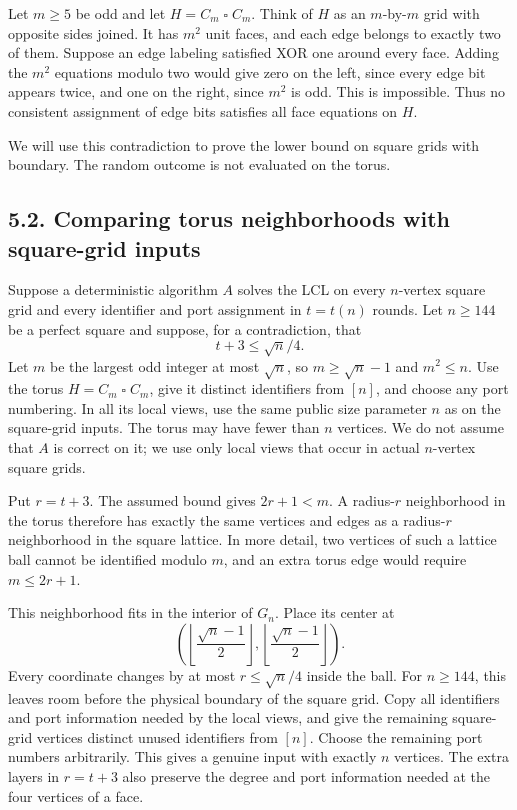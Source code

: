 \documentclass[11pt,a4paper]{article}
\begin{document}
Let \(m\ge5\) be odd and let \(H=C_m\mathbin{\square}C_m\).
Think of \(H\) as an \(m\)-by-\(m\) grid with opposite sides joined.
It has \(m^2\) unit faces, and each edge belongs to exactly two of them.
Suppose an edge labeling satisfied XOR one around every face.
Adding the \(m^2\) equations modulo two would give zero on the left, since every edge bit appears twice, and one on the right, since \(m^2\) is odd.
This is impossible.
Thus no consistent assignment of edge bits satisfies all face equations on \(H\).

We will use this contradiction to prove the lower bound on square grids with boundary.
The random outcome is not evaluated on the torus.

\subsection{5.2. Comparing torus neighborhoods with square-grid inputs}

Suppose a deterministic algorithm \(A\) solves the LCL on every \(n\)-vertex square grid and every identifier and port assignment in \(t=t(n)\) rounds.
Let \(n\ge144\) be a perfect square and suppose, for a contradiction, that
\begin{equation} t+3\le\sqrt n/4. \label{eq:grid-fast-algorithm} \end{equation}
Let \(m\) be the largest odd integer at most \(\sqrt n\), so \(m\ge\sqrt n-1\) and \(m^2\le n\).
Use the torus \(H=C_m\mathbin{\square}C_m\), give it distinct identifiers from \([n]\), and choose any port numbering.
In all its local views, use the same public size parameter \(n\) as on the square-grid inputs.
The torus may have fewer than \(n\) vertices.
We do not assume that \(A\) is correct on it; we use only local views that occur in actual \(n\)-vertex square grids.

Put \(r=t+3\).
The assumed bound gives \(2r+1<m\).
A radius-\(r\) neighborhood in the torus therefore has exactly the same vertices and edges as a radius-\(r\) neighborhood in the square lattice.
In more detail, two vertices of such a lattice ball cannot be identified modulo \(m\), and an extra torus edge would require \(m\le2r+1\).

This neighborhood fits in the interior of \(G_n\).
Place its center at
\[ \left(\left\lfloor\frac{\sqrt n-1}{2}\right\rfloor,\left\lfloor\frac{\sqrt n-1}{2}\right\rfloor\right). \]
Every coordinate changes by at most \(r\le\sqrt n/4\) inside the ball.
For \(n\ge144\), this leaves room before the physical boundary of the square grid.
Copy all identifiers and port information needed by the local views, and give the remaining square-grid vertices distinct unused identifiers from \([n]\).
Choose the remaining port numbers arbitrarily.
This gives a genuine input with exactly \(n\) vertices.
The extra layers in \(r=t+3\) also preserve the degree and port information needed at the four vertices of a face.
\end{document}
